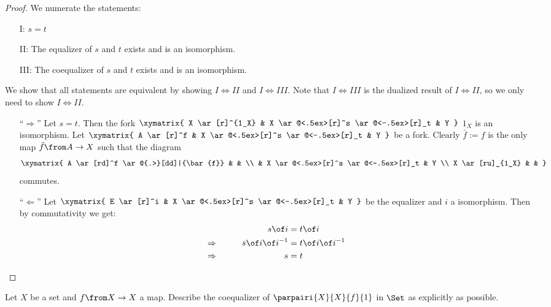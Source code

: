 \begin{answer}
  \begin{proof}
    We numerate the statements:
    \begin{itemize}
      \item  [I:]$s=t$
      \item [II:]The equalizer of $s$ and $t$ exists and is an isomorphism.
      \item[III:]The coequalizer of $s$ and $t$ exists and is an isomorphism.
    \end{itemize}
    We show that all statements are equivalent by showing $I \Leftrightarrow II$ and $I \Leftrightarrow III$.
    Note that $I \Leftrightarrow III$ is the dualized result of $I \Leftrightarrow II$, so we only need to show $I \Leftrightarrow II$.

    \begin{itemize}
      \item[``$\Rightarrow$'']
        Let $s=t$. Then the fork
        $\xymatrix{
          X \ar[r]^{1_X} & X \ar@<.5ex>[r]^s \ar@<-.5ex>[r]_t & Y
        }$
        $1_X$ is an isomorphism.
        Let
        $\xymatrix{
          A \ar[r]^f & X \ar@<.5ex>[r]^s \ar@<-.5ex>[r]_t & Y
        }$
        be a fork.
        Clearly $\bar{f} := f$ is the only map $\bar{f} \from A \to X$ such that the diagram
        \[ \xymatrix{
          A \ar[rd]^f \ar@{.>}[dd]|{\bar{f}} & & \\
          & X \ar@<.5ex>[r]^s \ar@<-.5ex>[r]_t & Y \\
          X \ar[ru]_{1_X} & &
        } \]
        commutes.
      \item[``$\Leftarrow$'']
        Let
        $\xymatrix{
          E \ar[r]^i & X \ar@<.5ex>[r]^s \ar@<-.5ex>[r]_t & Y
        }$
        be the equalizer and $i$ a isomorphism. Then by commutativity we get:
        \begin{alignat*}{4}
          && s \of i &= t \of i \\
          \Rightarrow  &\qquad& s \of i \of i^{-1} &= t \of i \of i^{-1} \\
          \Rightarrow  &      & s &= t
        \end{alignat*}\qedhere
    \end{itemize}
  \end{proof}
\end{answer}

\begin{exercise}
  Let $X$ be a set and $f\from X \to X$ a map.  Describe the coequalizer of
  $\parpairi{X}{X}{f}{1}$ in $\Set$ as explicitly as possible.
\end{exercise}

